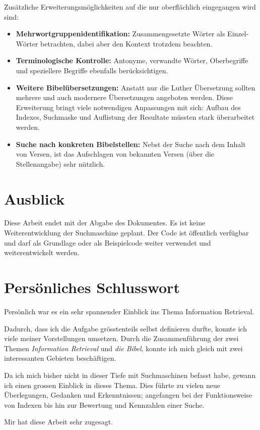Zusätzliche Erweiterungsmöglichkeiten auf die nur oberflächlich eingegangen wird sind:
\begin{itemize}[noitemsep]
	\item \textbf{Mehrwortgruppenidentifikation:} Zusammengesetzte Wörter als Einzel-Wörter betrachten, dabei aber den Kontext trotzdem beachten.
	
	\item \textbf{Terminologische Kontrolle:} Antonyme, verwandte Wörter, Oberbegriffe und speziellere Begriffe ebenfalls berücksichtigen.

	\item \textbf{Weitere Bibelübersetzungen:} Anstatt nur die Luther Übersetzung sollten mehrere und auch modernere Übersetzungen angeboten werden. Diese Erweiterung bringt viele notwendigen Anpassungen mit sich: Aufbau des Indexes, Suchmaske und Auflistung der Resultate müssten stark überarbeitet werden.

	\item \textbf{Suche nach konkreten Bibelstellen:} Nebst der Suche nach dem Inhalt von Versen, ist das Aufschlagen von bekannten Versen (über die Stellenangabe) sehr nützlich.
\end{itemize}


\section{Ausblick}
Diese Arbeit endet mit der Abgabe des Dokumentes.
Es ist keine Weiterentwicklung der Suchmaschine geplant. Der Code ist öffentlich verfügbar und darf als Grundlage oder als Beispielcode weiter verwendet und weiterentwickelt werden.


\section{Persönliches Schlusswort}
Persönlich war es ein sehr spannender Einblick ins Thema Information Retrieval.

Dadurch, dass ich die Aufgabe grösstenteils selbst definieren durfte, konnte ich viele meiner Vorstellungen umsetzen.
Durch die Zusammenführung der zwei Themen \textit{Information Retrieval} und \textit{die Bibel}, konnte ich mich gleich mit zwei interessanten Gebieten beschäftigen.

Da ich mich bisher nicht in dieser Tiefe mit Suchmaschinen befasst habe, gewann ich einen grossen Einblick in dieses Thema. Dies führte zu vielen neue Überlegungen, Gedanken und Erkenntnissen; angefangen bei der Funktionsweise von Indexen bis hin zur Bewertung und Kennzahlen einer Suche.

Mir hat diese Arbeit sehr zugesagt.
